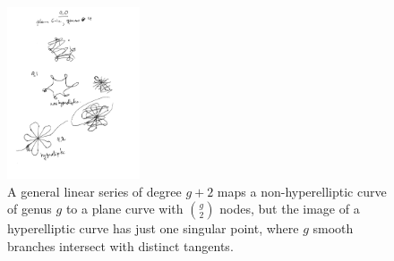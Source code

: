 \begin{figure}
\begin{center}
\centerline {\includegraphics[height=2in]{"Fig9.0.pdf"}}
\caption{A general linear series of degree $g+2$ maps a non-hyperelliptic curve of genus $g$
to a plane curve with $\binom{g}{2}$ nodes, but the image of a hyperelliptic curve has
just one singular point, where $g$ smooth branches intersect with distinct tangents.}
\label{Fig9.1}
\end{center}
\end{figure}

